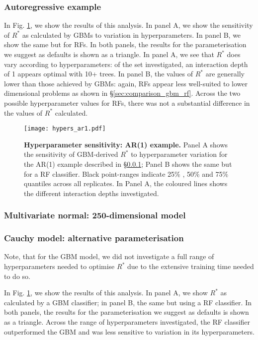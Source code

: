 \documentclass{article}
\begin{document}
\subsubsection{Autoregressive example}\label{sec:hyperparameters_ar1}
In Fig. \ref{fig:hypers_ar1}, we show the results of this analysis. In panel A, we show the sensitivity of $R^*$ as calculated by GBMs to variation in hyperparameters. In panel B, we show the same but for RFs. In both panels, the results for the parameterisation we suggest as defaults is shown as a triangle. In panel A, we see that $R^*$ does vary according to hyperparameters: of the set investigated, an interaction depth of 1 appears optimal with 10+ trees. In panel B, the values of $R^*$ are generally lower than those achieved by GBMs: again, RFs appear less well-suited to lower dimensional problems as shown in \S\ref{sec:comparison_gbm_rf}. Across the two possible hyperparameter values for RFs, there was not a substantial difference in the values of $R^*$ calculated.

\begin{figure}[!htb]
	\centerline{\texttt{[image: hypers\_ar1.pdf]}}
	\caption{\textbf{Hyperparameter sensitivity: AR(1) example.} Panel A shows the sensitivity of GBM-derived $R^*$ to hyperparameter variation for the AR(1) example described in \S\ref{sec:hyperparameters_ar1}; Panel B shows the same but for a RF classifier. Black point-ranges indicate 25\% , 50\% and 75\% quantiles across all replicates. In Panel A, the coloured lines shows the different interaction depths investigated.}
	\label{fig:hypers_ar1}
\end{figure}

\subsubsection{Multivariate normal: 250-dimensional model}

\subsubsection{Cauchy model: alternative parameterisation}\label{sec:hyperparameters_cauchy}
Note, that for the GBM model, we did not investigate a full range of hyperparameters needed to optimise $R^*$ due to the extensive training time needed to do so. 

In Fig. \ref{fig:hypers_ar1}, we show the results of this analysis. In panel A, we show $R^*$ as calculated by a GBM classifier; in panel B, the same but using a RF classifier. In both panels, the results for the parameterisation we suggest as defaults is shown as a triangle. Across the range of hyperparameters investigated, the RF classifier outperformed the GBM and was less sensitive to variation in its hyperparameters.
\end{document}
